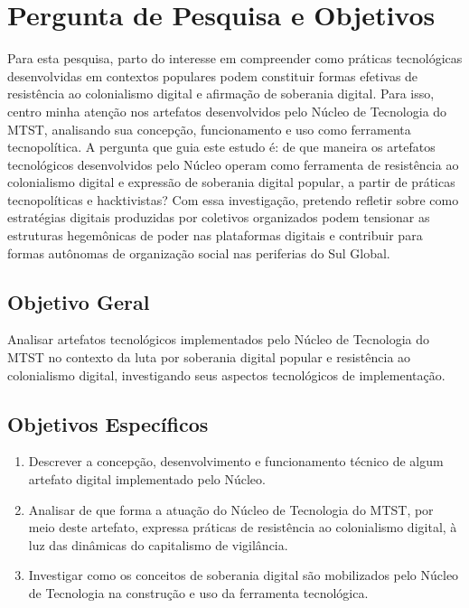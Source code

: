 \section{Pergunta de Pesquisa e Objetivos}
\label{sec:perg}
Para esta pesquisa, parto do interesse em compreender como práticas tecnológicas desenvolvidas em contextos populares podem constituir formas efetivas de resistência ao colonialismo digital e afirmação de soberania digital. Para isso, centro minha atenção nos artefatos desenvolvidos pelo Núcleo de Tecnologia do MTST, analisando sua concepção, funcionamento e uso como ferramenta tecnopolítica. A pergunta que guia este estudo é: de que maneira os artefatos tecnológicos desenvolvidos pelo Núcleo operam como ferramenta de resistência ao colonialismo digital e expressão de soberania digital popular, a partir de práticas tecnopolíticas e hacktivistas? Com essa investigação, pretendo refletir sobre como estratégias digitais produzidas por coletivos organizados podem tensionar as estruturas hegemônicas de poder nas plataformas digitais e contribuir para formas autônomas de organização social nas periferias do Sul Global.

\subsection{Objetivo Geral}
\label{subsec:objEs}

Analisar artefatos tecnológicos implementados pelo Núcleo de Tecnologia do MTST no contexto da luta por soberania digital popular e resistência ao colonialismo digital, investigando seus aspectos tecnológicos de implementação.

\subsection{Objetivos Específicos}
\label{subsec:objEs}

\begin{enumerate}
    \item Descrever a concepção, desenvolvimento e funcionamento técnico de algum artefato digital implementado pelo Núcleo.
    
    \item Analisar de que forma a atuação do Núcleo de Tecnologia do MTST, por meio deste artefato, expressa práticas de resistência ao colonialismo digital, à luz das dinâmicas do capitalismo de vigilância.

    \item Investigar como os conceitos de soberania digital são mobilizados pelo Núcleo de Tecnologia na construção e uso da ferramenta tecnológica.
    
\end{enumerate}

